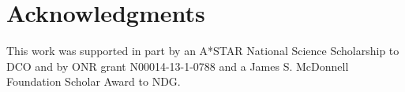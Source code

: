 \documentclass[10pt,letterpaper]{article}
\begin{document}



\section{Acknowledgments}

This work was supported in part by an A*STAR National Science Scholarship to DCO and by ONR grant N00014-13-1-0788 and a James S. McDonnell Foundation Scholar Award to NDG.




\setlength{\bibleftmargin}{.125in}
\setlength{\bibindent}{-\bibleftmargin}


\end{document}
